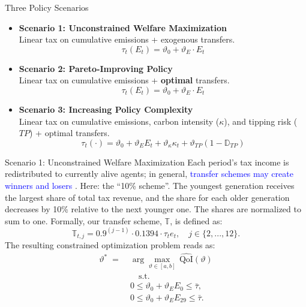 \documentclass[10pt,aspectratio=169]{beamer}
\begin{document}
\begin{frame}{Three Policy Scenarios}
\small
    \begin{itemize}
        \setlength\itemsep{1em}
        \item \textbf{Scenario 1: Unconstrained Welfare Maximization} \\
        \small{Linear tax on cumulative emissions + exogenous transfers.}
        \begin{equation*}
            \tau_t(E_t) = \vartheta_0 + \vartheta_E \cdot E_t
        \end{equation*}
        \item \textbf{Scenario 2: Pareto-Improving Policy} \\
        \small{Linear tax on cumulative emissions + \textbf{optimal} transfers.}
        \begin{equation*}
             \tau_t(E_t) = \vartheta_0 + \vartheta_E \cdot E_t
        \end{equation*}
        \item \textbf{Scenario 3: Increasing Policy Complexity} \\
        \small{Linear tax on cumulative emissions, carbon intensity ($\kappa$), and tipping risk ($TP$) + optimal transfers.}
        \begin{equation*}
            \tau_t(\cdot) = \vartheta_0 + \vartheta_E E_t + \vartheta_\kappa \kappa_t + \vartheta_{TP} (1-\mathbb{D}_{TP})
        \end{equation*}
    \end{itemize}
\end{frame}

\begin{frame}{Scenario 1: Unconstrained Welfare Maximization}
\small
Each period's tax income is redistributed to currently alive agents; in general, \textcolor{blue}{transfer schemes may create winners and losers} \citep{kotlikoff2021making}. Here: the ``10\% scheme''. The youngest generation receives the largest share of total tax revenue, and the share for each older generation decreases by 10\% relative to the next younger one. The shares are normalized to sum to one. Formally, our transfer scheme, $\mathbb{T}$, is defined as:
\begin{equation}
    \mathbb{T}_{t,j} = 0.9^{(j-1)} \cdot 0.1394 \cdot \tau_t e_t, \quad j \in \{2,...,12 \}.
\end{equation}
The resulting constrained optimization problem reads as:
\begin{equation}
\label{eq:optim_cum_emm_maxwelf}
\begin{aligned}
  \vartheta^{\ast}
  \;=\;
  & \arg\max_{\vartheta\in[a,b]}\,
  \widehat{\mathrm{QoI}}(\vartheta) \\
& \quad \text{s.t.} \\
& 0 \leq \vartheta_0 + \vartheta_E  E_0 \leq \bar{\tau}, \\
& 0 \leq \vartheta_0 + \vartheta_E  E_{29} \leq \bar{\tau}.
\end{aligned}
\end{equation}
\end{frame}
\end{document}
